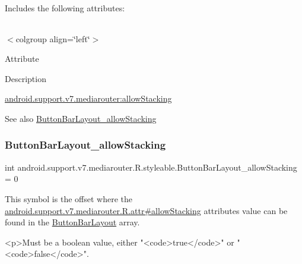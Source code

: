 Includes the following attributes\+:

\tabulinesep=1mm
\begin{longtabu} spread 0pt [c]{*{0}{|X[-1]}|}
\hline
\end{longtabu}
$<$colgroup align=\char`\"{}left\char`\"{}$>$ 

Attribute

Description 

{\ttfamily \hyperlink{classandroid_1_1support_1_1v7_1_1mediarouter_1_1R_1_1styleable_a7e4d2a0c7ab7cdbb0c587c661f3eed1d}{android.\+support.\+v7.\+mediarouter\+:allow\+Stacking}}

\begin{DoxySeeAlso}{See also}
\hyperlink{classandroid_1_1support_1_1v7_1_1mediarouter_1_1R_1_1styleable_a7e4d2a0c7ab7cdbb0c587c661f3eed1d}{Button\+Bar\+Layout\+\_\+allow\+Stacking} 
\end{DoxySeeAlso}
\mbox{\label{classandroid_1_1support_1_1v7_1_1mediarouter_1_1R_1_1styleable_a7e4d2a0c7ab7cdbb0c587c661f3eed1d}} 
\subsubsection{\texorpdfstring{Button\+Bar\+Layout\+\_\+allow\+Stacking}{ButtonBarLayout\_allowStacking}}
{\footnotesize\ttfamily int android.\+support.\+v7.\+mediarouter.\+R.\+styleable.\+Button\+Bar\+Layout\+\_\+allow\+Stacking = 0\hspace{0.3cm}{\ttfamily [static]}}

This symbol is the offset where the \hyperlink{classandroid_1_1support_1_1v7_1_1mediarouter_1_1R_1_1attr_a33ad140b54a5244d27e885a1443ff302}{android.\+support.\+v7.\+mediarouter.\+R.\+attr\#allow\+Stacking} attribute\textquotesingle{}s value can be found in the \hyperlink{classandroid_1_1support_1_1v7_1_1mediarouter_1_1R_1_1styleable_a593f0c0986a9c8a483e9872a27fb061d}{Button\+Bar\+Layout} array.

\begin{DoxyVerb}      <p>Must be a boolean value, either "<code>true</code>" or "<code>false</code>".
\end{DoxyVerb}
 

